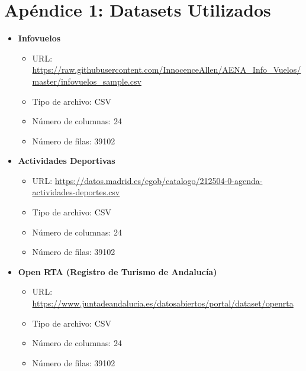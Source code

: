 \section*{Apéndice 1: Datasets Utilizados}

\begin{itemize}
	\item \textbf{Infovuelos}
	\begin{itemize}
		\item URL: \url{https://raw.githubusercontent.com/InnocenceAllen/AENA_Info_Vuelos/master/infovuelos_sample.csv}
		\item Tipo de archivo: CSV
		\item Número de columnas: 24
		\item Número de filas: 39102
	\end{itemize}
	
	\item \textbf{Actividades Deportivas}
	\begin{itemize}
		\item URL: \url{https://datos.madrid.es/egob/catalogo/212504-0-agenda-actividades-deportes.csv}
		\item Tipo de archivo: CSV
		\item Número de columnas: 24
		\item Número de filas: 39102
	\end{itemize}
	
	\item \textbf{Open RTA (Registro de Turismo de Andalucía)}
	\begin{itemize}
		\item URL: \url{https://www.juntadeandalucia.es/datosabiertos/portal/dataset/openrta}
		\item Tipo de archivo: CSV
		\item Número de columnas: 24
		\item Número de filas: 39102
	\end{itemize}
\end{itemize}